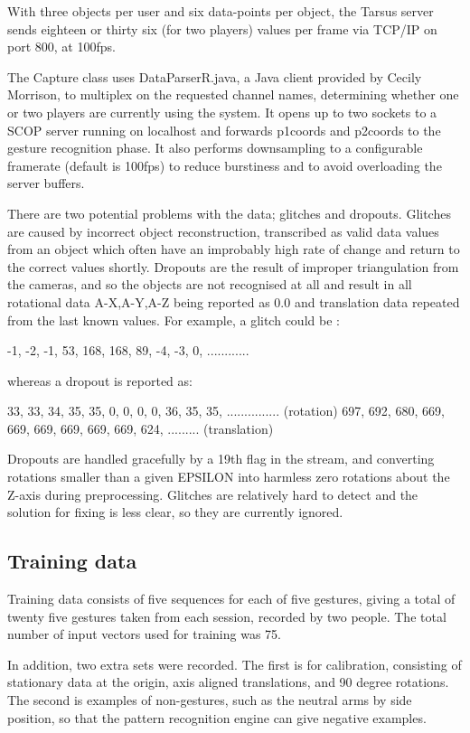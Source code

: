 \documentclass[12pt,a4,notitlepage]{report}
\renewcommand{\_}{\texttt{\symbol{95}}}
\newcommand{\<}{\texttt{\symbol{60}}}
\renewcommand{\>}{\texttt{\symbol{62}}}
\begin{document}
With three objects per user and six data-points per object, the Tarsus server sends eighteen or thirty six (for two players) values per frame via TCP/IP on port 800, at 100fps.

The Capture class uses DataParserR.java, a Java client provided by Cecily Morrison, to multiplex on the requested channel names, determining whether one or two players are currently using the system. It opens up to two sockets to a SCOP server running on localhost and forwards p1coords and p2coords to the gesture recognition phase. It also performs downsampling to a configurable framerate (default is 100fps) to reduce burstiness and to avoid overloading the server buffers.

There are two potential problems with the data; glitches and dropouts. Glitches are caused by incorrect object reconstruction, transcribed as valid data values from an object which often have an improbably high rate of change and return to the correct values shortly. Dropouts are the result of improper triangulation from the cameras, and so the objects are not recognised at all and result in all rotational data A-X,A-Y,A-Z being reported as 0.0 and translation data repeated from the last known values. For example, a glitch could be :

-1, -2, -1, 53, 168, 168, 89, -4, -3, 0, ............

whereas a dropout is reported as:

33, 33, 34, 35, 35, 0, 0, 0, 0, 36, 35, 35, ............... (rotation)
697, 692, 680, 669, 669, 669, 669, 669, 669, 624, ......... (translation)

Dropouts are handled gracefully by a 19th flag in the stream, and converting rotations smaller than a given EPSILON into harmless zero rotations about the Z-axis during preprocessing. Glitches are relatively hard to detect and the solution for fixing is less clear, so they are currently ignored.

\subsection{Training data}

Training data consists of five sequences for each of five gestures, giving a total of twenty five gestures taken from each session, recorded by two people. The total number of input vectors used for training was 75.

In addition, two extra sets were recorded. The first is for calibration, consisting of stationary data at the origin, axis aligned translations, and 90 degree rotations. The second is examples of non-gestures, such as the neutral arms by side position, so that the pattern recognition engine can give negative examples.
\end{document}

